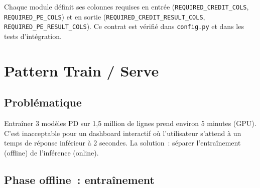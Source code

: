 \documentclass[12pt,a4paper]{article}
\begin{document}
\begin{interpretbox}
Chaque module d\'efinit ses colonnes requises en entr\'ee (\texttt{REQUIRED\_CREDIT\_COLS}, \texttt{REQUIRED\_PE\_COLS}) et en sortie (\texttt{REQUIRED\_CREDIT\_RESULT\_COLS}, \texttt{REQUIRED\_PE\_RESULT\_COLS}). Ce contrat est v\'erifi\'e dans \texttt{config.py} et dans les tests d'int\'egration.
\end{interpretbox}


\section{Pattern Train / Serve}
\label{sec:trainserve}

\subsection{Probl\'ematique}

Entra\^iner 3 mod\`eles PD sur 1,5 million de lignes prend environ 5 minutes (GPU). C'est inacceptable pour un dashboard interactif o\`u l'utilisateur s'attend \`a un temps de r\'eponse inf\'erieur \`a 2 secondes. La solution~: s\'eparer l'entra\^inement (offline) de l'inf\'erence (online).

\subsection{Phase offline~: entra\^inement}
\end{document}
